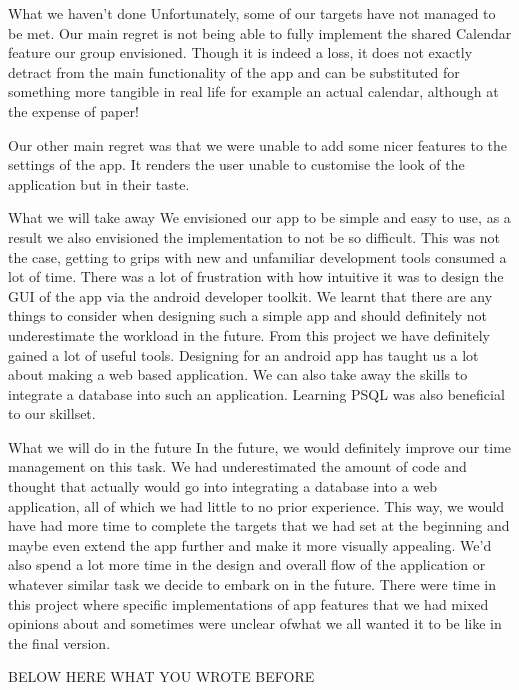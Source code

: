 \documentclass[a4paper,11pt]{article}
\begin{document}
What we haven't done
Unfortunately, some of our targets have not managed to be met. Our main regret is not being able to fully implement the shared Calendar feature our group envisioned. Though it is indeed a loss, it does not exactly detract from the main functionality of the app and can be substituted for something more tangible in real life for example an actual calendar, although at the expense of paper!

Our other main regret was that we were unable to add some nicer features to the settings of the app. It renders the user unable to customise the look of the application but in their taste. 

What we will take away
We envisioned our app to be simple and easy to use, as a result we also envisioned the implementation to not be so difficult. This was not the case, getting to grips with new and unfamiliar development tools consumed a lot of time. There was a lot of frustration with how intuitive it was to design the GUI of the app via the android developer toolkit. We learnt that there are any things to consider when designing such a simple app and should definitely not underestimate the workload in the future. 
From this project we have definitely gained a lot of useful tools. Designing for an android app has taught us a lot about making a web based application. We can also take away the skills to integrate a database into such an application.  Learning PSQL was also beneficial to our skillset. 

What we will do in the future
In the future, we would definitely improve our time management on this task. We had underestimated the amount of code and thought that actually would go into integrating a database into a web application, all of which we had little to no prior experience.
This way, we would have had more time to complete the targets that we had set at the beginning and maybe even extend the app further and make it more visually appealing. 
We'd also spend a lot more time in the design and overall flow of the application or whatever similar task we decide to embark on in the future. There were time in this project where specific implementations of app features that we had mixed opinions about and sometimes were unclear ofwhat we all wanted it to be like in the final version.

BELOW HERE WHAT YOU WROTE BEFORE\\
\end{document}
